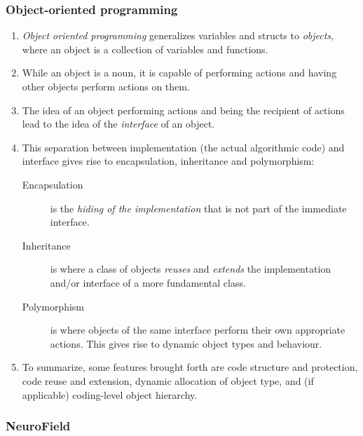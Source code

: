 \documentclass[12pt,a4paper]{article}
\begin{document}
\subsubsection{Object-oriented programming}

\begin{enumerate}
\item \emph{Object oriented programming} generalizes variables and structs to \emph{objects}, where an object is a collection of variables and functions.
	
\item While an object is a noun, it is capable of performing actions and having other objects perform actions on them.

\item The idea of an object performing actions and being the recipient of actions lead to the idea of the \emph{interface} of an object.

\item This separation between implementation (the actual algorithmic code) and interface gives rise to encapsulation, inheritance and polymorphism:
	\begin{description}
		\item [Encapsulation] is the \emph{hiding of the implementation} that is not part of the immediate interface.
		\item [Inheritance] is where a class of objects \emph{reuses} and \emph{extends} the implementation and/or interface of a more fundamental class.
		\item [Polymorphism] is where objects of the same interface perform their own appropriate actions. This gives rise to dynamic object types and behaviour.
	\end{description}

\item To summarize, some features brought forth are code structure and protection, code reuse and extension, dynamic allocation of object type, and (if applicable) coding-level object hierarchy.
\end{enumerate}

\subsubsection{NeuroField}
\end{document}
